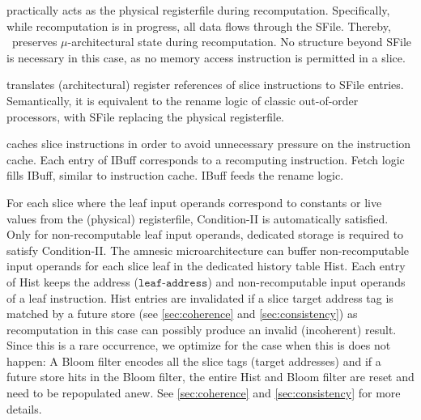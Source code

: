  practically acts as the physical registerfile during recomputation. 
Specifically, while recomputation is in progress, all data flows through the SFile. Thereby, \arch\ preserves $\mu$-architectural state during recomputation. No structure beyond SFile is necessary in this case, as no memory access instruction is permitted in a slice.

 translates (architectural) register references of slice instructions to SFile entries.
Semantically, it is equivalent to the rename logic of classic out-of-order processors, with SFile replacing the physical registerfile. 

caches slice instructions in order to avoid
unnecessary pressure on the instruction cache.
Each entry of IBuff corresponds to a recomputing instruction. Fetch logic fills IBuff, similar to instruction cache. IBuff feeds the rename logic. 

For each slice  where the leaf input operands correspond to constants or live
values from the (physical) registerfile, {Condition-II} is automatically
satisfied.  Only for non-recomputable leaf input operands, dedicated storage is
required to satisfy {Condition-II}. The amnesic microarchitecture can buffer
non-recomputable input operands for each slice leaf in the dedicated history
table Hist.
Each entry of Hist 
keeps the address ($\texttt{leaf-address}$) and non-recomputable input operands of a leaf
instruction.
{\color{magenta} Hist entries are invalidated if a slice target address tag is matched by a future store (see \autoref{sec:coherence} and \autoref{sec:consistency}) as recomputation in this case can possibly produce an invalid (incoherent) result.
Since this is a rare occurrence, we optimize for the case when this is does not happen: A Bloom filter encodes all the slice tags (target addresses) and if a future store hits in the Bloom filter, the entire Hist and Bloom filter are reset and need to be repopulated anew. See \autoref{sec:coherence} and \autoref{sec:consistency} for more details.}

